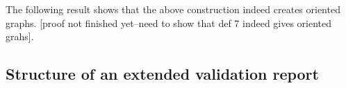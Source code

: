 \documentclass[a4paper, 11pt,titlepage]{article}
\newtheorem{theorem}{Theorem}
\begin{document}
The following result shows that the above construction indeed creates
oriented graphs. [proof not finished yet--need to show that def 7 indeed gives
oriented grahs].
%


\subsection{Structure of an extended validation report}


\end{document}
